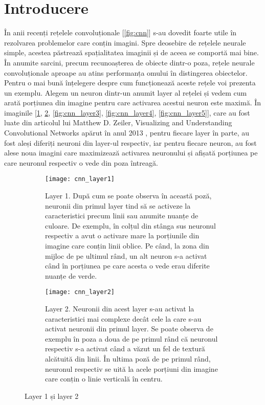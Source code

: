 \section{Introducere}
În anii recenți rețelele convoluționale [\ref{fig:cnn}] s-au dovedit foarte utile în rezolvarea problemelor care conțin imagini. Spre deosebire de rețelele neurale simple, acestea păstrează spațialitatea imaginii și de aceea se comportă mai bine. În anumite sarcini, precum recunoașterea de obiecte dintr-o poza, rețele neurale convoluționale aproape au atins performanța omului în distingerea obiectelor. Pentru o mai bună înțelegere despre cum funcționează aceste rețele voi prezenta un exemplu. \cite{coursera_convnets}\cite{matthew2013} Alegem un neuron dintr-un anumit layer al rețelei și vedem cum arată porțiunea din imagine pentru care activarea acestui neuron este maximă. În imaginile [\ref{fig:cnn_layer1}, \ref{fig:cnn_layer2}, \ref{fig:cnn_layer3}, \ref{fig:cnn_layer4}, \ref{fig:cnn_layer5}], care au fost luate din articolul lui Matthew D. Zeiler, Visualizing and Understanding Convolutional Networks apărut în anul 2013 \cite{matthew2013}, pentru fiecare layer în parte, au fost aleși diferiți neuroni din layer-ul respectiv, iar pentru fiecare neuron, au fost alese noua imagini care maximizează activarea neuronului și afișată porțiunea pe care neuronul respectiv o vede din poza întreagă.
\begin{figure}[h]
	\centering
	\begin{subfigure}[b]{0.4\textwidth}
		\centering
        \texttt{[image: cnn\_layer1]}
        \caption{Layer 1. După cum se poate observa în această poză, neuronii din primul layer tind să se activeze la caracteristici precum linii sau anumite nuanțe de culoare. De exemplu, în colțul din stânga sus neuronul respectiv a avut o activare mare la porțiunile din imagine care conțin linii oblice. Pe când, la zona din mijloc de pe ultimul rând, un alt neuron s-a activat când în porțiunea pe care acesta o vede erau diferite nuanțe de verde.}
        \label{fig:cnn_layer1}
	\end{subfigure}
    \hfill
    \begin{subfigure}[b]{0.4\textwidth}
		\centering
        \texttt{[image: cnn\_layer2]}
        \caption{Layer 2. Neuronii din acest layer s-au activat la caracteristici mai complexe decât cele la care s-au activat neuronii din primul layer. Se poate observa de exemplu în poza a doua de pe primul rând că neuronul respectiv s-a activat când a văzut un fel de textură alcătuită din linii. În ultima poză de pe primul rând, neuronul respectiv se uită la acele porțiuni din imagine care conțin o linie verticală în centru.}
        \label{fig:cnn_layer2}
	\end{subfigure}
    \caption{Layer 1 și layer 2}
    \label{fig:cnn_layer1_2}
\end{figure}
